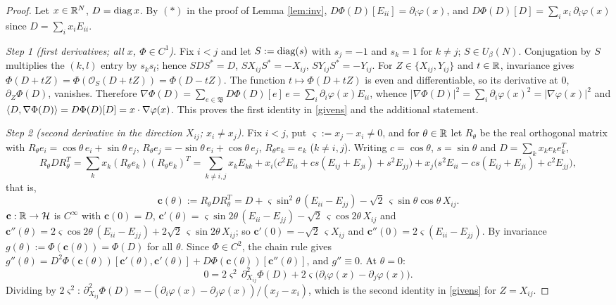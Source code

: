 \begin{proof}
Let $x\in\mathbb{R}^N$, $D=\operatorname{diag} x$. By $(\ast)$ in the proof of Lemma \ref{lem:inv}, $D\Phi(D)[E_{ii}]=\partial_i\varphi(x)$, and $D\Phi(D)[D]=\sum_ix_i\,\partial_i\varphi(x)$ since $D=\sum_ix_iE_{ii}$.

\emph{Step 1 (first derivatives; all $x$, $\Phi\in C^1$).} Fix $i<j$ and let $S:=\operatorname{diag}(s)$ with $s_j=-1$ and $s_k=1$ for $k\ne j$; $S\in U_\beta(N)$. Conjugation by $S$ multiplies the $(k,l)$ entry by $s_ks_l$; hence $SDS^*=D$, $SX_{ij}S^*=-X_{ij}$, $SY_{ij}S^*=-Y_{ij}$.
For $Z\in\{X_{ij},Y_{ij}\}$ and $t\in\mathbb{R}$, invariance gives $\Phi(D+tZ)=\Phi(\mathcal O_S(D+tZ))=\Phi(D-tZ)$. The function $t\mapsto\Phi(D+tZ)$ is even and differentiable, so its derivative at $0$, $\partial_Z\Phi(D)$, vanishes.
Therefore $\nabla\Phi(D)=\sum_{e\in\mathfrak B}D\Phi(D)[e]\,e=\sum_i\partial_i\varphi(x)E_{ii}$, whence $|\nabla\Phi(D)|^2=\sum_i\partial_i\varphi(x)^2=|\nabla\varphi(x)|^2$ and $\langle D,\nabla\Phi(D)\rangle=D\Phi(D)[D]=x\cdot\nabla\varphi(x)$.
This proves the first identity in \eqref{givens} and the additional statement.

\emph{Step 2 (second derivative in the direction $X_{ij}$; $x_i\ne x_j$).} Fix $i<j$, put $\varsigma:=x_j-x_i\ne0$, and for $\theta\in\mathbb{R}$ let $R_\theta$ be the real orthogonal matrix with $R_\theta e_i=\cos\theta\,e_i+\sin\theta\,e_j$, $R_\theta e_j=-\sin\theta\,e_i+\cos\theta\,e_j$, $R_\theta e_k=e_k$ ($k\ne i,j$). Writing $c=\cos\theta$, $s=\sin\theta$ and $D=\sum_kx_ke_ke_k^T$,
\[R_\theta DR_\theta^T=\sum_kx_k(R_\theta e_k)(R_\theta e_k)^T=\sum_{k\ne i,j}x_kE_{kk}+x_i\big(c^2E_{ii}+cs(E_{ij}+E_{ji})+s^2E_{jj}\big)+x_j\big(s^2E_{ii}-cs(E_{ij}+E_{ji})+c^2E_{jj}\big),\]
that is,
\begin{equation}\label{c4:rot}
\mathbf c(\theta):=R_\theta DR_\theta^T=D+\varsigma\sin^2\theta\,(E_{ii}-E_{jj})-\sqrt2\,\varsigma\sin\theta\cos\theta\,X_{ij}.
\end{equation}
$\mathbf c:\mathbb{R}\to\mathcal{H}$ is $C^\infty$ with $\mathbf c(0)=D$,
$\mathbf c'(\theta)=\varsigma\sin2\theta\,(E_{ii}-E_{jj})-\sqrt2\,\varsigma\cos2\theta\,X_{ij}$ and $\mathbf c''(\theta)=2\varsigma\cos2\theta\,(E_{ii}-E_{jj})+2\sqrt2\,\varsigma\sin2\theta\,X_{ij}$; so
$\mathbf c'(0)=-\sqrt2\,\varsigma X_{ij}$ and $\mathbf c''(0)=2\varsigma(E_{ii}-E_{jj})$.
By invariance $g(\theta):=\Phi(\mathbf c(\theta))=\Phi(D)$ for all $\theta$. Since $\Phi\in C^2$, the chain rule gives $g''(\theta)=D^2\Phi(\mathbf c(\theta))[\mathbf c'(\theta),\mathbf c'(\theta)]+D\Phi(\mathbf c(\theta))[\mathbf c''(\theta)]$, and $g''\equiv0$. At $\theta=0$:
\[0=2\varsigma^2\,\partial^2_{X_{ij}}\Phi(D)+2\varsigma\big(\partial_i\varphi(x)-\partial_j\varphi(x)\big).\]
Dividing by $2\varsigma^2$: $\partial^2_{X_{ij}}\Phi(D)=-(\partial_i\varphi(x)-\partial_j\varphi(x))/(x_j-x_i)$, which is the second identity in \eqref{givens} for $Z=X_{ij}$.


\end{proof}
